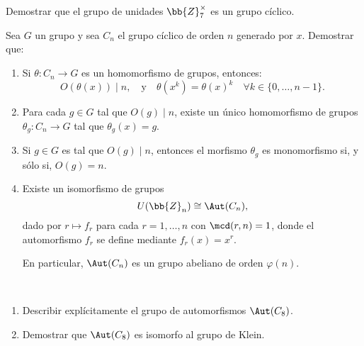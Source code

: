 \begin{ejercicio}\label{ej:3.16}
    Demostrar que el grupo de unidades $\bb{Z}_7^\times$ es un grupo cíclico.
\end{ejercicio}

\begin{ejercicio}\label{ej:3.17}
    Sea $G$ un grupo y sea $C_n$ el grupo cíclico de orden $n$ generado por $x$. Demostrar que:
    \begin{enumerate}
        \item Si $\theta : C_n \to G$ es un homomorfismo de grupos, entonces:
        \begin{equation*}
            O(\theta(x))\mid n, \quad \text{y} \quad \theta(x^k) = \theta(x)^k \quad \forall k \in \{0, \ldots, n - 1\}.
        \end{equation*}

        \item Para cada $g \in G$ tal que $O(g) \mid n$, existe un único homomorfismo de grupos $\theta_g : C_n \to G$ tal que $\theta_g(x) = g$.
        
        \item Si $g \in G$ es tal que $O(g) \mid n$, entonces el morfismo $\theta_g$ es monomorfismo si, y sólo si, $O(g) = n$.
        
        \item Existe un isomorfismo de grupos
        \begin{equation*}
            U(\bb{Z}_n) \cong \Aut(C_n),
        \end{equation*}
        dado por $r \mapsto f_r$ para cada $r = 1, \ldots, n$ con $\mcd(r, n) = 1$, donde el automorfismo $f_r$ se define mediante $f_r(x) = x^r$.

        En particular, $\Aut(C_n)$ es un grupo abeliano de orden $\varphi(n)$.
    \end{enumerate}
\end{ejercicio}

\begin{ejercicio}\label{ej:3.18}~
    \begin{enumerate}
        \item Describir explícitamente el grupo de automorfismos $\Aut(C_8)$.
        \item Demostrar que $\Aut(C_8)$ es isomorfo al grupo de Klein.
    \end{enumerate}
\end{ejercicio}